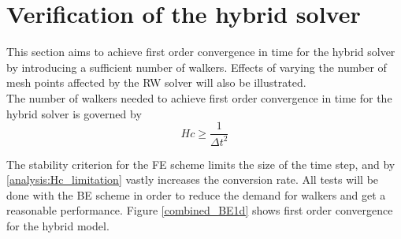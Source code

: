 \section{Verification of the hybrid solver}

This section aims to achieve first order convergence in time for the hybrid solver by introducing a sufficient number of walkers. 
Effects of varying the number of mesh points affected by the RW solver will also be illustrated. \\

The number of walkers needed to achieve first order convergence in time for the hybrid solver is governed by 
\begin{equation}\label{analysis:Hc_limitation}
 Hc\geq\frac{1}{\Delta t^2}
\end{equation}

\noindent The stability criterion for the FE scheme limits the size of the time step, and by \eqref{analysis:Hc_limitation} vastly increases the conversion rate. 
All tests will be done with the BE scheme in order to reduce the demand for walkers and get a reasonable performance. 
Figure \ref{combined_BE1d} shows first order convergence for the hybrid model.

